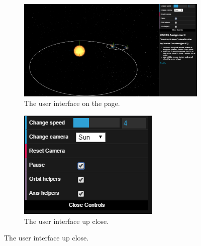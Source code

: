 \documentclass[12pt]{article}
\begin{document}
\begin{figure}[H]
        \centering
        \begin{subfigure}[b]{0.4\textwidth}
                \includegraphics[width=\textwidth]{images/userinterface}
                \caption{The user interface on the page.}
                \label{fig: The user interface.}
	 \end{subfigure}
        \begin{subfigure}[b]{0.4\textwidth}
                \includegraphics[width=\textwidth]{images/closeupui}
                \caption{The user interface up close.}
                \label{fig: Close up of the user interface.}
	 \end{subfigure}
      
\end{figure}
\end{document}
